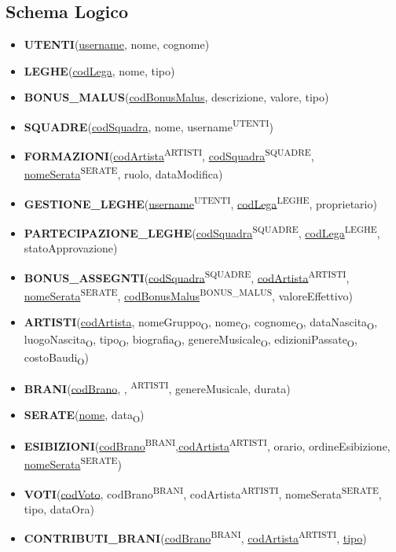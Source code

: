 \documentclass[a4paper,12pt]{article}
\begin{document}
\subsection{Schema Logico}
\begin{itemize}
	\item \textbf{UTENTI}(\underline{username}, nome, cognome)
	\item \textbf{LEGHE}(\underline{codLega}, nome, tipo)
	\item \textbf{BONUS\_MALUS}(\underline{codBonusMalus}, descrizione, valore, tipo)
	\item \textbf{SQUADRE}(\underline{codSquadra}, nome, username\textsuperscript{UTENTI})
	\item \textbf{FORMAZIONI}(\underline{codArtista}\textsuperscript{ARTISTI}, \underline{codSquadra}\textsuperscript{SQUADRE}, \underline{nomeSerata}\textsuperscript{SERATE}, ruolo, dataModifica)
	
	\item \textbf{GESTIONE\_LEGHE}(\underline{username}\textsuperscript{UTENTI}, \underline{codLega}\textsuperscript{LEGHE}, proprietario)
	\item \textbf{PARTECIPAZIONE\_LEGHE}(\underline{codSquadra}\textsuperscript{SQUADRE}, \underline{codLega}\textsuperscript{LEGHE}, statoApprovazione)
	\item \textbf{BONUS\_ASSEGNTI}(\underline{codSquadra}\textsuperscript{SQUADRE}, \underline{codArtista}\textsuperscript{ARTISTI}, \underline{nomeSerata}\textsuperscript{SERATE}, \underline{codBonusMalus}\textsuperscript{BONUS\_MALUS}, valoreEffettivo)
	
	\item \textbf{ARTISTI}(\underline{codArtista}, nomeGruppo\textsubscript{O}, nome\textsubscript{O}, cognome\textsubscript{O}, dataNascita\textsubscript{O}, luogoNascita\textsubscript{O}, tipo\textsubscript{O}, biografia\textsubscript{O}, genereMusicale\textsubscript{O}, edizioniPassate\textsubscript{O}, costoBaudi\textsubscript{O})
	\item \textbf{BRANI}(\underline{codBrano}, , \textsuperscript{ARTISTI}, genereMusicale, durata)
	\item \textbf{SERATE}(\underline{nome}, data\textsubscript{O})
	\item \textbf{ESIBIZIONI}(\underline{codBrano}\textsuperscript{BRANI},\underline{codArtista}\textsuperscript{ARTISTI}, orario, ordineEsibizione, \underline{nomeSerata}\textsuperscript{SERATE})
	\item \textbf{VOTI}(\underline{codVoto}, codBrano\textsuperscript{BRANI}, codArtista\textsuperscript{ARTISTI}, nomeSerata\textsuperscript{SERATE}, tipo, dataOra)
	\item \textbf{CONTRIBUTI\_BRANI}(\underline{codBrano}\textsuperscript{BRANI}, \underline{codArtista}\textsuperscript{ARTISTI}, \underline{tipo})
\end{itemize}
\end{document}
